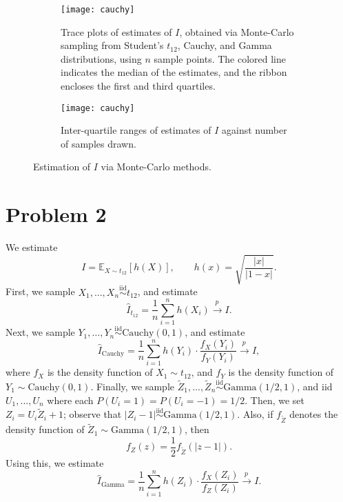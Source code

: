 \documentclass[10pt]{article}
\newcommand{\E}{\mathbb{E}}
\newcommand{\iid}{\overset{\text{iid}}{\sim}}
\newcommand{\topr}{\overset{p\,}{\longrightarrow}}
\begin{document}
    \begin{figure}[H]
        \centering
        \begin{subfigure}{\textwidth}
            \centering
            \texttt{[image: cauchy]}
            \caption{
                Trace plots of estimates of $I$, obtained via Monte-Carlo
                sampling from Student's $t_{12}$, Cauchy, and Gamma
                distributions, using $n$ sample points.
                The colored line indicates the median of the estimates, and
                the ribbon encloses the first and third quartiles.
            }
            \label{fig:P1_trace}
        \end{subfigure}

        \vspace{2em}
        \begin{subfigure}{\textwidth}
            \centering
            \texttt{[image: cauchy]}
            \caption{
                Inter-quartile ranges of estimates of $I$ against number of
                samples drawn.
            }
            \label{fig:P1_IQR}
        \end{subfigure}
        \caption{Estimation of $I$ via Monte-Carlo methods.}
        \label{fig:P1}
    \end{figure}


    \clearpage

    \section*{Problem 2}

    We estimate \[
        I = \E_{X \sim t_{12}}[h(X)], \qquad h(x) = \sqrt{\frac{|x|}{|1 - x|}}.
    \]
    First, we sample $X_1, \dots, X_n \iid t_{12}$, and estimate \[
        \hat{I}_{t_{12}} = \frac{1}{n} \sum_{i = 1}^n h(X_i) \topr I.
    \] Next, we sample $Y_1, \dots, Y_n \iid \text{Cauchy}(0, 1)$, and
    estimate \[
        \hat{I}_{\text{Cauchy}} = \frac{1}{n}\sum_{i = 1}^n h(Y_i)\cdot \frac{f_X(Y_i)}{f_Y(Y_i)} \topr I,
    \] where $f_X$ is the density function of $X_1 \sim t_{12}$, and $f_Y$ is
    the density function of $Y_1 \sim \text{Cauchy}(0, 1)$.
    Finally, we sample $\tilde{Z}_1, \dots, \tilde{Z}_n \iid \text{Gamma}(1/2,
    1)$, and iid $U_1, \dots, U_n$ where each $P(U_i = 1) = P(U_i = -1) =
    1/2$. Then, we set $Z_i = U_i\tilde{Z}_i + 1$; observe that $|Z_i - 1|
    \iid \text{Gamma}(1/2, 1)$. Also, if $f_{\tilde{Z}}$ denotes the density
    function of $\tilde{Z}_1 \sim \text{Gamma}(1/2, 1)$, then \[
        f_Z(z) = \frac{1}{2}f_{\tilde{Z}}(|z - 1|).
    \] Using this, we estimate \[
        \hat{I}_{\text{Gamma}} = \frac{1}{n}\sum_{i = 1}^n h(Z_i)\cdot \frac{f_X(Z_i)}{f_Z(Z_i)} \topr I.
    \]
\end{document}
